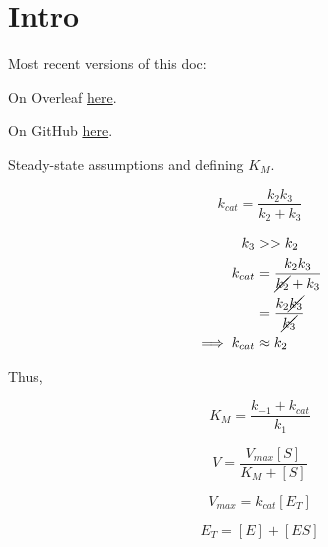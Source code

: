 \documentclass{article}
\title{\vspace{-2cm}}
\author{MedicinalYoyos}
\begin{document}
\maketitle

\section*{Intro}

Most recent versions of this doc:

On Overleaf \href{https://www.overleaf.com/read/rgykqvzvfnvv}{here}.

On GitHub \href{https://github.com/Yoyomanzoor/BiochemPassage/blob/main/main.pdf}{here}.

Steady-state assumptions and defining $K_M$.

\begin{center}
\end{center}

\begin{equation}
    k_{cat} = \frac{k_2k_3}{k_2 + k_3}
\end{equation}

\begin{align*}
    k_3 &>> k_2 \\
    k_{cat} &= \frac{k_2k_3}{\cancel{k_2} + k_3} \\
    &= \frac{k_2\cancel{k_3}}{\cancel{k_3}} \nonumber \\
    \implies k_{cat} &\approx k_2
\end{align*}

Thus,

\begin{center}
\end{center}

\begin{equation}
    K_M = \frac{k_{-1} + k_{cat}}{k_1}
\end{equation}

\begin{equation}
    V = \frac{V_{max}[S]}{K_M + [S]}
\end{equation}

\begin{equation}
    V_{max} = k_{cat} [E_T]
\end{equation}

\begin{equation}
    E_T = [E] + [ES]
\end{equation}
\end{document}
